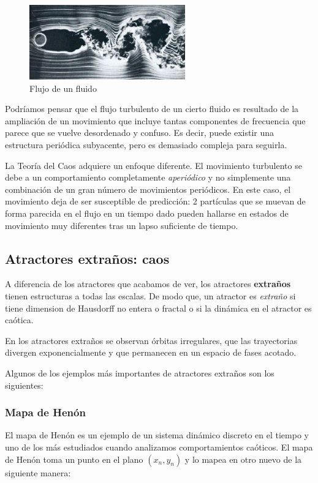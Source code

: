 \begin{figure}[hbtp]
\centering
\includegraphics[width = 0.6\textwidth]{img/flujo_turb.jpg}
\caption{Flujo de un fluido}
\label{fig:flujo_turb}
\end{figure}


Podríamos pensar que el flujo turbulento de un cierto fluido es resultado de la ampliación de un movimiento que incluye tantas componentes de frecuencia que parece que se vuelve desordenado y confuso. Es decir, puede existir una estructura periódica subyacente, pero es demasiado compleja para seguirla.

La Teoría del Caos adquiere un enfoque diferente. El movimiento turbulento se debe a un comportamiento completamente \emph{aperiódico} y no simplemente una combinación de un gran número de movimientos periódicos. En este caso, el movimiento  deja de ser susceptible de predicción: 2 partículas que se muevan de forma parecida en el flujo en un tiempo dado pueden hallarse en estados de movimiento muy diferentes tras un lapso suficiente de tiempo.


\subsection{Atractores extraños: caos}

\begin{definition}
A diferencia de los atractores que acabamos de ver, los atractores \textbf{extraños} tienen estructuras a todas las escalas. De modo que, un atractor es \emph{extraño} si tiene dimension de Hausdorff no entera o fractal o si la dinámica en el atractor es caótica.
\end{definition}
En los atractores extraños se observan órbitas irregulares, que las trayectorias divergen exponencialmente y que permanecen en un espacio de fases acotado.


Algunos de los ejemplos más importantes de atractores extraños son los siguientes:

\subsubsection{Mapa de Henón}
El mapa de Henón es un ejemplo de un sistema dinámico discreto en el tiempo y uno de los más estudiados cuando analizamos comportamientos caóticos. El mapa de Henón toma un punto en el plano $(x_n,y_n)$ y lo mapea en otro nuevo de la siguiente manera:\newline

